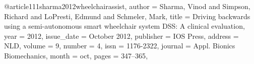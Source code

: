 @article{111sharma2012wheelchairassist,
author = {Sharma, Vinod and Simpson, Richard and LoPresti, Edmund and Schmeler, Mark},
title = {Driving backwards using a semi-autonomous smart wheelchair system DSS: A clinical evaluation},
year = {2012},
issue_date = {October 2012},
publisher = {IOS Press},
address = {NLD},
volume = {9},
number = {4},
issn = {1176-2322},
journal = {Appl. Bionics Biomechanics},
month = {oct},
pages = {347–365},
}